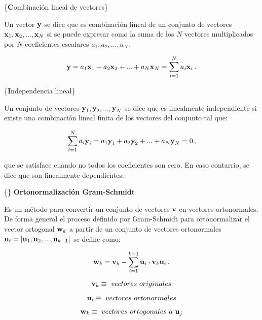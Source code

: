 \documentclass[
]{agujournal2019}
\begin{document}
\vspace{0.5cm}

\{\noindent \textbf Combinación lineal de vectores\}

Un vector \({\textbf y}\) se dice que es combinación lineal de un
conjunto de vectores \({\textbf x}_1, {\textbf x}_2, ...,{\textbf x}_N\)
si se puede expresar como la suma de los \(N\) vectores multiplicados
por \(N\) coeficientes escalares \(a_1,a_2,...,a_N\):

\[{\textbf y}=a_1 {\textbf x}_1 + a_2 {\textbf x}_2 +...+a_N {\textbf x}_N=\sum\limits^N_{i=1}a_i {\textbf x}_i\,.\]

\vspace{0.5cm}

\{\noindent \textbf Independencia lineal\}

Un conjunto de vectores
\({\textbf y}_1, {\textbf y}_2, ...,{\textbf y}_N\) se dice que es
linealmente independiente si existe una combinación lineal finita de los
vectores del conjunto tal que:

\[\sum\limits^N_{i=1} a_i {\textbf y}_i=a_1{\textbf y}_1 + a_2{\textbf y}_2+...+a_N{\textbf y}_N=0\,,\]

que se satisface cuando no todos los coeficientes son cero. En caso
contarrio, se dice que son linealmente dependientes.

\vspace{0.5cm}

\{\noindent\} \textbf{Ortonormalización Gram-Schmidt}

Es un método para convertir un conjunto de vectores \({\textbf v}\) en
vectores ortonormales. De forma general el proceso definido por
Gram-Schmidt para ortonormalizar el vector ortogonal \({\textbf w}_k\) a
partir de un conjunto de vectores ortonormales
\({\textbf u}_i=[{\textbf u}_1, {\textbf u}_2,...,{\textbf u}_{k-1}]\)
se define como:

\[{\textbf w}_k={\textbf v}_k-\sum\limits^{k-1}_{i=1} {\textbf u}_i\cdot{\textbf v}_k{\textbf u}_i\,.\]

\vspace{0.25cm}

\[{\textbf v}_k\equiv\,\,{ vectores}\,\,{ originales}\]

\[{\textbf u}_i\equiv\,\,{ vectores}\,\,{ ortonormales}\]

\[{\textbf w}_k\equiv\,\,{ vectores}\,\,{ ortogonales}\,\,{ a}\,\,{\textbf u}_j\]

\vspace{0.25cm}
\end{document}
